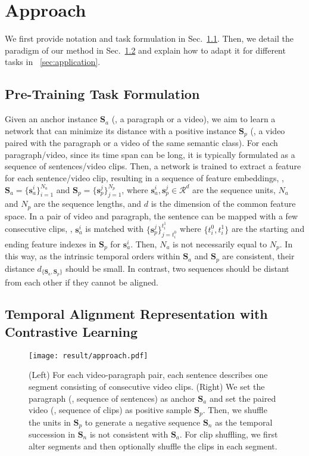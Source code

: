 \section{Approach}

We first provide notation and task formulation in Sec.~\ref{sec:formulation}. Then, we detail the paradigm of our method in Sec.~\ref{sec:approach} and explain how to adapt it for different tasks in ~\ref{sec:application}. 

\subsection{Pre-Training Task Formulation}\label{sec:formulation}

Given an anchor instance $\mathbf{S}_a$ (\ie, a paragraph or a video), we aim to learn a network that can minimize its distance with a positive instance $\mathbf{S}_p$ (\ie, a video paired with the paragraph or a video of the same semantic class).
For each paragraph/video, since its time span can be long, it is typically formulated as a sequence of sentences/video clips. Then, a network is trained to extract a feature for each sentence/video clip, resulting in a sequence of feature embeddings, \ie, $\mathbf{S}_a = \{\mathbf{s}_a^i\}_{i=1}^{N_a}$ and $\mathbf{S}_p = \{\mathbf{s}_p^j\}_{j=1}^{N_p}$, where $\mathbf{s}_a^i, \mathbf{s}_p^j \in \mathcal{R}^d$ are the sequence units, $N_a$ and $N_p$ are the sequence lengths, and $d$ is the dimension of the common feature space. 
In a pair of video and paragraph, the sentence can be mapped with a few consecutive clips, \ie, $\mathbf{s}_a^i$ is matched with $\{\mathbf{s}_p^j\}_{j=t_i^0}^{t_i^1}$ where $\{t_i^0,t_i^1\}$ are the starting and ending feature indexes in $\mathbf{S}_p$ for $\mathbf{s}_a^i$. Then, $N_a$ is not necessarily equal to $N_p$.
In this way, as the intrinsic temporal orders within $\mathbf{S}_a$ and $\mathbf{S}_p$ are consistent, their distance $d_{\{\mathbf{S}_a,\mathbf{S}_p\}}$ should be small. In contrast, two sequences should be distant from each other if they cannot be aligned.

\subsection{Temporal Alignment Representation with Contrastive Learning}\label{sec:approach}

\begin{figure}
    \centering
    \texttt{[image: result/approach.pdf]}
    \caption{(Left) For each video-paragraph pair, each sentence describes one segment consisting of consecutive video clips. 
    (Right) We set the paragraph (\ie, sequence of sentences) as anchor $\mathbf{S}_a$ and set the paired video (\ie, sequence of clips) as positive sample $\mathbf{S}_p$. Then, we shuffle the units in $\mathbf{S}_p$ to generate a negative sequence $\mathbf{S}_n$ as the temporal succession in $\mathbf{S}_n$ is not consistent with $\mathbf{S}_a$. For clip shuffling, we first alter segments and then optionally shuffle the clips in each segment.}
    \label{fig:approach}
\end{figure}

